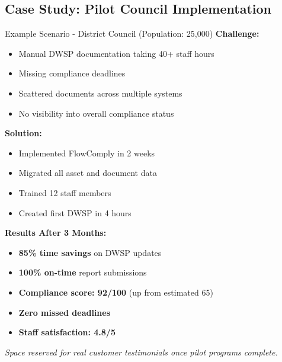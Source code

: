 \documentclass[11pt,a4paper]{article}
\begin{document}
\subsection{Case Study: Pilot Council Implementation}

\begin{featurebox}{Example Scenario - District Council (Population: 25,000)}
    \textbf{Challenge:}
    \begin{itemize}[itemsep=0.2em]
        \item Manual DWSP documentation taking 40+ staff hours
        \item Missing compliance deadlines
        \item Scattered documents across multiple systems
        \item No visibility into overall compliance status
    \end{itemize}

    \vspace{0.5cm}
    \textbf{Solution:}
    \begin{itemize}[itemsep=0.2em]
        \item Implemented FlowComply in 2 weeks
        \item Migrated all asset and document data
        \item Trained 12 staff members
        \item Created first DWSP in 4 hours
    \end{itemize}

    \vspace{0.5cm}
    \textbf{Results After 3 Months:}
    \begin{itemize}[itemsep=0.2em]
        \item \textbf{85\% time savings} on DWSP updates
        \item \textbf{100\% on-time} report submissions
        \item \textbf{Compliance score: 92/100} (up from estimated 65)
        \item \textbf{Zero missed deadlines}
        \item \textbf{Staff satisfaction: 4.8/5}
    \end{itemize}
\end{featurebox}

\vspace{1cm}

\textit{Space reserved for real customer testimonials once pilot programs complete.}

\newpage
\end{document}
